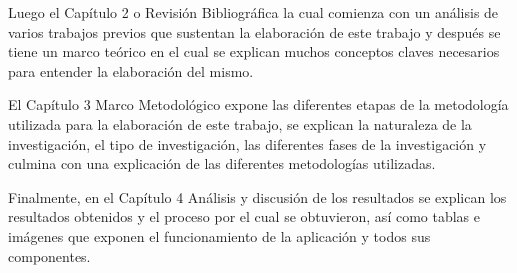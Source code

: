 Luego el Capítulo 2 o Revisión Bibliográfica la cual comienza con un
análisis de varios trabajos previos que sustentan la elaboración de este
trabajo y después se tiene un marco teórico en el cual se explican muchos
conceptos claves necesarios para entender la elaboración del mismo.

El Capítulo 3 Marco Metodológico expone las diferentes etapas de la metodología
utilizada para la elaboración de este trabajo, se explican la naturaleza de la
investigación, el tipo de investigación, las diferentes fases de la
investigación  y culmina con una explicación de las diferentes metodologías
utilizadas.
\thispagestyle{myheadings}
Finalmente, en el Capítulo 4 Análisis y discusión de los resultados se explican los
resultados obtenidos y el proceso por el cual se obtuvieron, así
como tablas e imágenes que exponen el funcionamiento de la aplicación y todos
sus componentes.


